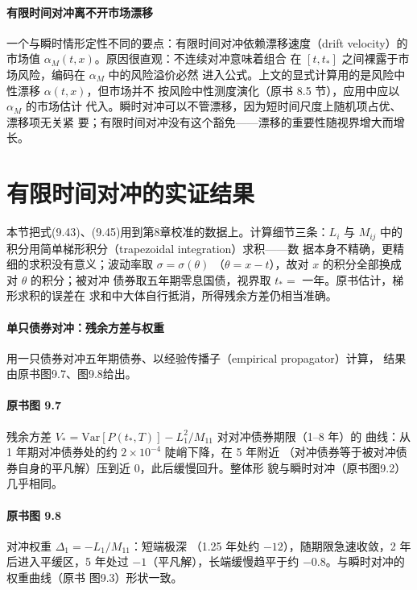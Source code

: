 \paragraph{有限时间对冲离不开市场漂移}
一个与瞬时情形定性不同的要点：有限时间对冲依赖漂移速度（drift
velocity）的市场值 $\alpha_M(t,x)$。原因很直观：不连续对冲意味着组合
在 $[t,t_*]$ 之间裸露于市场风险，编码在 $\alpha_M$ 中的风险溢价必然
进入公式。上文的显式计算用的是风险中性漂移 $\alpha(t,x)$，但市场并不
按风险中性测度演化（原书 8.5 节），应用中应以 $\alpha_M$ 的市场估计
代入。瞬时对冲可以不管漂移，因为短时间尺度上随机项占优、漂移项无关紧
要；有限时间对冲没有这个豁免——漂移的重要性随视界增大而增长。

\section{有限时间对冲的实证结果}

本节把式(9.43)、(9.45)用到第8章校准的数据上。计算细节三条：$L_i$ 与
$M_{ij}$ 中的积分用简单梯形积分（trapezoidal integration）求积——数
据本身不精确，更精细的求积没有意义；波动率取 $\sigma=\sigma(\theta)$
（$\theta=x-t$），故对 $x$ 的积分全部换成对 $\theta$ 的积分；被对冲
债券取五年期零息国债，视界取 $t_*=$ 一年。原书估计，梯形求积的误差在
求和中大体自行抵消，所得残余方差仍相当准确。

\paragraph{单只债券对冲：残余方差与权重}
用一只债券对冲五年期债券、以经验传播子（empirical propagator）计算，
结果由原书图9.7、图9.8给出。

\paragraph{原书图 9.7}\quad 残余方差
$V_*=\mathrm{Var}[P(t_*,T)]-L_1^2/M_{11}$ 对对冲债券期限（1--8 年）的
曲线：从 1 年期对冲债券处的约 $2\times10^{-4}$ 陡峭下降，在 5 年附近
（对冲债券等于被对冲债券自身的平凡解）压到近 0，此后缓慢回升。整体形
貌与瞬时对冲（原书图9.2）几乎相同。

\paragraph{原书图 9.8}\quad 对冲权重 $\Delta_1=-L_1/M_{11}$：短端极深
（1.25 年处约 $-12$），随期限急速收敛，2 年后进入平缓区，5 年处过
$-1$（平凡解），长端缓慢趋平于约 $-0.8$。与瞬时对冲的权重曲线（原书
图9.3）形状一致。

